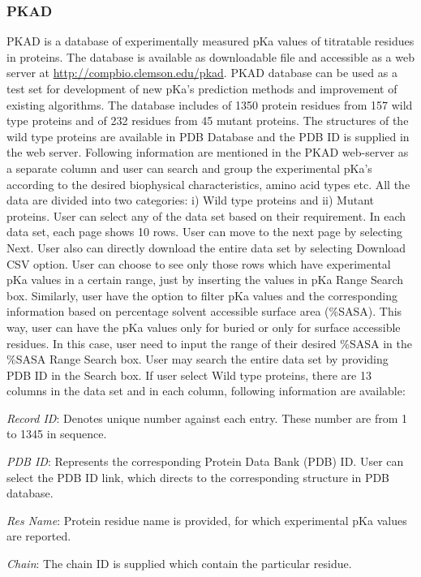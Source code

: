 \documentclass[9pt,tutorial]{livecoms}
\begin{document}
\subsubsection{PKAD}
PKAD is a database of experimentally measured pKa values of titratable residues in proteins. The database\cite{pahari2019pkad} is available as downloadable file and accessible as a web server at \url{http://compbio.clemson.edu/pkad}. PKAD database can be used as a test set for development of new pKa’s prediction methods and improvement of existing algorithms. The database includes of 1350 protein residues from 157 wild type proteins and of 232 residues from 45 mutant proteins. The structures of the wild type proteins are available in PDB Database and the PDB ID is supplied in the web server. Following information are mentioned in the PKAD web-server as a separate column and user can search and group the experimental pKa’s according to the desired biophysical characteristics, amino acid types etc. All the data are divided into two categories: i) Wild type proteins and ii) Mutant proteins. User can select any of the data set based on their requirement. In each data set, each page shows 10 rows. User can move to the next page by selecting Next. User also can directly download the entire data set by selecting Download CSV option. User can choose to see only those rows which have experimental pKa values in a certain range, just by inserting the values in pKa Range Search box. Similarly, user have the option to filter pKa values and the corresponding information based on percentage solvent accessible surface area (\%SASA). This way, user can have the pKa values only for buried or only for surface accessible residues. In this case, user need to input the range of their desired \%SASA in the \%SASA Range Search box. User may search the entire data set by providing PDB ID in the Search box. If user select Wild type proteins, there are 13 columns in the data set and in each column, following information are available:

\textit{Record ID}: Denotes unique number against each entry. These number are from 1 to 1345 in sequence.

\textit{PDB ID}: Represents the corresponding Protein Data Bank (PDB) ID. User can select the PDB ID link, which directs to the corresponding structure in PDB database. 

\textit{Res Name}: Protein residue name is provided, for which experimental pKa values are reported.

\textit{Chain}: The chain ID is supplied which contain the particular residue.
\end{document}
